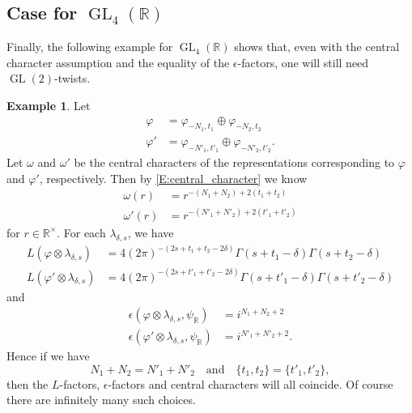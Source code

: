 \documentclass[11pt]{amsart}
\theoremstyle{plain}
\theoremstyle{definition}
\newtheorem{Ex}{Example}
\numberwithin{equation}{section}
\newcommand{\R}{\mathbb{R}}
\newcommand{\la}{\lambda}
\newcommand{\GL}{\operatorname{GL}}
\begin{document}
\subsection{Case for $\GL_4(\R)$}
Finally, the following example for $\GL_4(\R)$ shows that,
even with the central character assumption and the equality of the
$\epsilon$-factors, one will still need $\GL(2)$-twists.
\begin{Ex}
Let
\begin{align*}
\varphi&=\varphi_{-N_1, t_1}\oplus\varphi_{-N_2, t_2}\\
\varphi'&=\varphi_{-N'_1, t'_1}\oplus\varphi_{-N'_2, t'_2}.
\end{align*}
Let $\omega$ and $\omega'$ be the central characters of the
representations corresponding to $\varphi$ and $\varphi'$,
respectively. Then by \eqref{E:central_character} we know
\begin{align*}
\omega(r)&=r^{-(N_1+N_2)+2(t_1+t_2)}\\
\omega'(r)&=r^{-(N'_1+N'_2)+2(t'_1+t'_2)}
\end{align*}
for $r\in\R^\times$. For each $\la_{\delta, s}$, we have
\begin{align*}
L(\varphi\otimes\la_{\delta,s})&=4(2\pi)^{-(2s+t_1+t_2-2\delta)}
\Gamma(s+t_1-\delta)\Gamma(s+t_2-\delta)\\
L(\varphi'\otimes\la_{\delta,s})&=4(2\pi)^{-(2s+t'_1+t'_2-2\delta)}
\Gamma(s+t'_1-\delta)\Gamma(s+t'_2-\delta)
\end{align*}
and
\begin{align*}
\epsilon(\varphi\otimes\la_{\delta,s}, \psi_\R)&=i^{N_1+N_2+2}\\
\epsilon(\varphi'\otimes\la_{\delta,s}, \psi_\R)&=i^{N'_1+N'_2+2}.
\end{align*}
Hence if we have
\[
N_1+N_2=N'_1+N'_2\quad\text{and}\quad \{t_1, t_2\}=\{t'_1, t'_2\}, 
\]
then the $L$-factors, $\epsilon$-factors and central characters will
all coincide. Of course there are infinitely many such choices.
\end{Ex}
\end{document}
